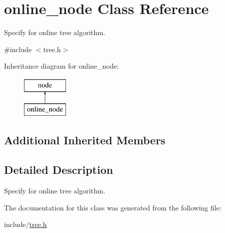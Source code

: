 \hypertarget{classonline__node}{\section{online\+\_\+node Class Reference}
\label{classonline__node}
}


Specify for online tree algorithm.  




{\ttfamily \#include $<$tree.\+h$>$}

Inheritance diagram for online\+\_\+node\+:\begin{figure}[H]
\begin{center}
\leavevmode
\includegraphics[height=2.000000cm]{classonline__node}
\end{center}
\end{figure}
\subsection*{Additional Inherited Members}


\subsection{Detailed Description}
Specify for online tree algorithm. 

The documentation for this class was generated from the following file\+:\begin{DoxyCompactItemize}
\item 
include/\hyperlink{tree_8h}{tree.\+h}\end{DoxyCompactItemize}
